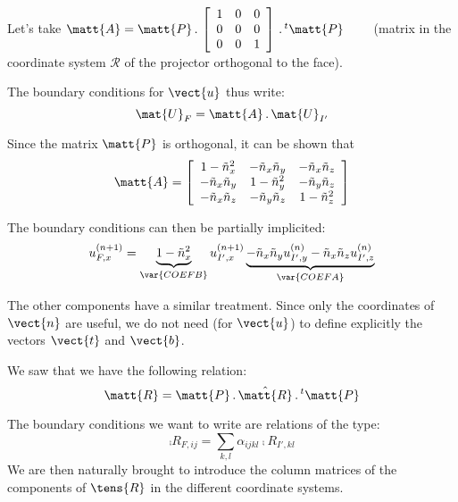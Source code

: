 Let's take
$\matt{A}=\matt{P}\,.\,\left[
\begin{array}{ccc}
1 & 0 & 0\\
0 & 0 & 0\\
0 & 0 & 1
\end{array}
\right]\,.\,^t\matt{P}\qquad$ (matrix in the coordinate system $\mathcal{R}$
of the projector orthogonal to the face).

The boundary conditions for  $\vect{u}$ thus write:
\begin{equation}
\mat{U}_F = \matt{A}\,.\,\mat{U}_{I'}
\end{equation}

Since the matrix $\matt{P}$ is orthogonal, it can be shown that
\begin{equation}
\matt{A}=\left[
\begin{array}{ccc}
1-\tilde{n}_x^2 & -\tilde{n}_x\tilde{n}_y & -\tilde{n}_x\tilde{n}_z\\
-\tilde{n}_x\tilde{n}_y & 1-\tilde{n}_y^2 & -\tilde{n}_y\tilde{n}_z\\
-\tilde{n}_x\tilde{n}_z & -\tilde{n}_y\tilde{n}_z & 1-\tilde{n}_z^2
\end{array}\right]
\end{equation}

The boundary conditions can then be partially implicited:
\begin{equation}
\label{Base_Clsyvt_eq_clU}
u_{F,x}^{(n+1)} = \underbrace{1-\tilde{n}_x^2}_{\var{COEFB}}u_{I',x}^{(n+1)}
\underbrace{-\tilde{n}_x\tilde{n}_y u_{I',y}^{(n)}
-\tilde{n}_x\tilde{n}_z u_{I',z}^{(n)}}_{\var{COEFA}}
\end{equation}

The other components have a similar treatment. Since only the coordinates
of $\vect{n}$ are useful, we do not need (for $\vect{u}$) to define
explicitly the vectors  $\vect{t}$ and $\vect{b}$.

\vspace{1cm}
We saw that we have the following relation:
\begin{equation}
\label{Base_Clsyvt_eq_chgtrepR}
\matt{R}= \matt{P}\,.\,\hat{\matt{R}}\,.\,^t\matt{P}
\end{equation}

The boundary conditions we want to write are relations of the type:
\begin{equation}
\comp{R}_{F,ij}=\sum_{k,l}\alpha_{ijkl}\comp{R}_{I',kl}
\end{equation}
We are then naturally brought to introduce the column matrices of the
components of $\tens{R}$ in the different coordinate systems.

